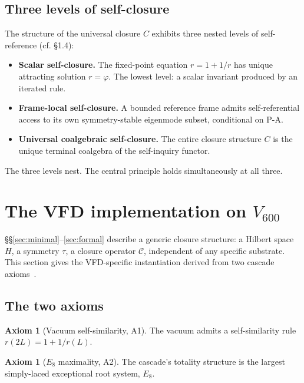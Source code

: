 \documentclass[11pt]{article}
\theoremstyle{plain}
\theoremstyle{definition}
\newtheorem{axiom}[theorem]{Axiom}
\theoremstyle{remark}
\newcommand{\Ccal}{\mathcal{C}}
\begin{document}
\subsection{Three levels of self-closure}

The structure of the universal closure $C$ exhibits three nested levels of self-reference (cf. \citet{SmartCapstone} \S 1.4):

\begin{itemize}[leftmargin=2em]
\item \textbf{Scalar self-closure.} The fixed-point equation $r = 1 + 1/r$ has unique attracting solution $r = \varphi$. The lowest level: a scalar invariant produced by an iterated rule.
\item \textbf{Frame-local self-closure.} A bounded reference frame admits self-referential access to its own symmetry-stable eigenmode subset, conditional on P-A.
\item \textbf{Universal coalgebraic self-closure.} The entire closure structure $C$ is the unique terminal coalgebra of the self-inquiry functor.
\end{itemize}

The three levels nest. The central principle holds simultaneously at all three.

\section{The VFD implementation on \texorpdfstring{$V_{600}$}{V600}}\label{sec:vfd-implementation}

\S\S\ref{sec:minimal}--\ref{sec:formal} describe a generic closure structure: a Hilbert space $H$, a symmetry $\tau$, a closure operator $\Ccal$, independent of any specific substrate. This section gives the VFD-specific instantiation derived from two cascade axioms~\citep{SmartXXXVI}.

\subsection{The two axioms}

\begin{axiom}[Vacuum self-similarity, A1]\label{ax:A1}
The vacuum admits a self-similarity rule $r(2L) = 1 + 1/r(L)$.
\end{axiom}

\begin{axiom}[$E_8$ maximality, A2]\label{ax:A2}
The cascade's totality structure is the largest simply-laced exceptional root system, $E_8$.
\end{axiom}
\end{document}
